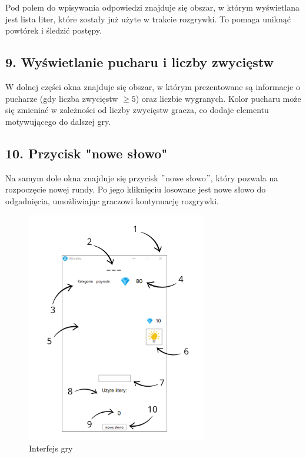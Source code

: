\documentclass[]{report}
\begin{document}
Pod polem do wpisywania odpowiedzi znajduje się obszar, w którym wyświetlana jest lista liter, które zostały już użyte w trakcie rozgrywki. To pomaga uniknąć powtórek i śledzić postępy.

\subsection*{9. Wyświetlanie pucharu i liczby zwycięstw}

W dolnej części okna znajduje się obszar, w którym prezentowane są informacje o pucharze (gdy liczba zwycięstw $\geq5$) oraz liczbie wygranych. Kolor pucharu może się zmieniać w zależności od liczby zwycięstw gracza, co dodaje elementu motywującego do dalszej gry.

\subsection*{10. Przycisk "nowe słowo"}

Na samym dole okna znajduje się przycisk $"$nowe słowo$"$, który pozwala na rozpoczęcie nowej rundy. Po jego kliknięciu losowane jest nowe słowo do odgadnięcia, umożliwiając graczowi kontynuację rozgrywki.
\\

\begin{figure}[h]
	\centering
	\includegraphics[width=0.7\textwidth]{interface}
	\caption{Interfejs gry}
	\label{fig:Interfejs}
\end{figure}
\end{document}
